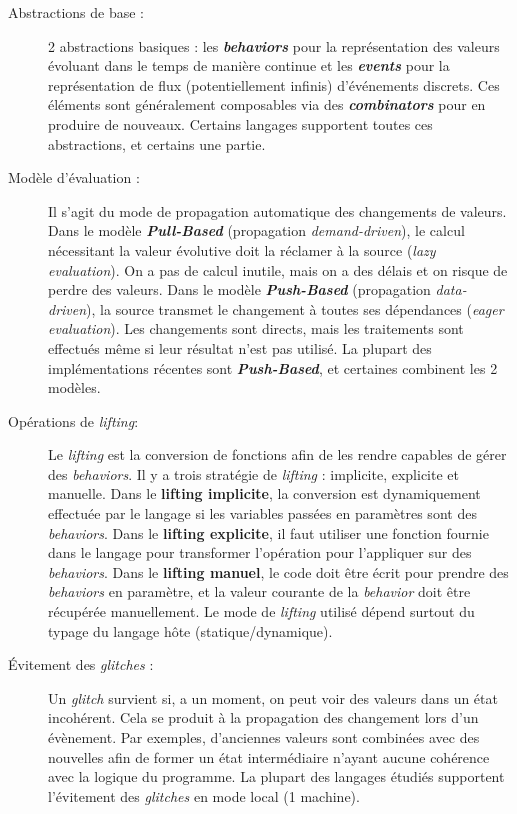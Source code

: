 \documentclass[10pt,final]{IEEEtran}
\begin{document}
\begin{description}
    \item[Abstractions de base :]
    2 abstractions basiques : les \textbf{\textit{behaviors}} pour la représentation des valeurs évoluant dans le temps de manière continue et les \textbf{\textit{events}} pour la représentation de flux (potentiellement infinis) d'événements discrets. Ces éléments sont généralement composables via des \textbf{\textit{combinators}} pour en produire de nouveaux. Certains langages supportent toutes ces abstractions, et certains une partie.
    
    \item[Modèle d'évaluation :]
    Il s'agit du mode de propagation automatique des changements de valeurs. Dans le modèle \textbf{\textit{Pull-Based}} (propagation \textit{demand-driven}), le calcul nécessitant la valeur évolutive doit la réclamer à la source (\textit{lazy evaluation}). On a pas de calcul inutile, mais on a des délais et on risque de perdre des valeurs. Dans le modèle \textbf{\textit{Push-Based}} (propagation \textit{data-driven}), la source transmet le changement à toutes ses dépendances (\textit{eager evaluation}). Les changements sont directs, mais les traitements sont effectués même si leur résultat n'est pas utilisé. La plupart des implémentations récentes sont \textbf{\textit{Push-Based}}, et certaines combinent les 2 modèles.
    
    \item[Opérations de \textit{lifting}:]
    Le \textit{lifting} est la conversion de fonctions afin de les rendre capables de gérer des \textit{behaviors}. Il y a trois stratégie de \textit{lifting} : implicite, explicite et manuelle. Dans le \textbf{lifting implicite}, la conversion est dynamiquement effectuée par le langage si les variables passées en paramètres sont des \textit{behaviors}. Dans le \textbf{lifting explicite}, il faut utiliser une fonction fournie dans le langage pour transformer l'opération pour l'appliquer sur des \textit{behaviors}. Dans le \textbf{lifting manuel}, le code doit être écrit pour prendre des \textit{behaviors} en paramètre, et la valeur courante de la \textit{behavior} doit être récupérée manuellement. Le mode de \textit{lifting} utilisé dépend surtout du typage du langage hôte (statique/dynamique).
    
    \item[Évitement des \textit{glitches} :]
    Un \textit{glitch} survient si, a un moment, on peut voir des valeurs dans un état incohérent. Cela se produit à la propagation des changement lors d'un évènement. Par exemples, d'anciennes valeurs sont combinées avec des nouvelles afin de former un état intermédiaire n'ayant aucune cohérence avec la logique du programme. La plupart des langages étudiés supportent l'évitement des \textit{glitches} en mode local (1 machine).
    

\end{description}
\end{document}
